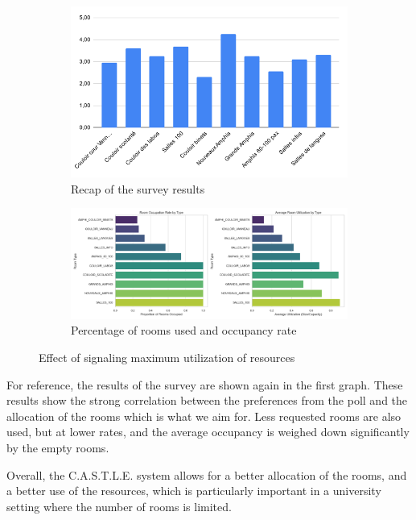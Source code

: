\documentclass[a4paper, oneside]{article}
\theoremstyle{plain}
\newcommand{\castle}{C{\small.}A{\small.}S{\small.}T{\small.}L{\small.}E{\small.}}
\begin{document}
\begin{figure}[H]
	\centering
	\begin{subfigure}{0.32\textwidth}
		\centering
		\includegraphics[width=\textwidth]{images/survey_result.png}
		\caption{Recap of the survey results}
		\label{fig:subfig1}
	\end{subfigure}
	\hfill
	\begin{subfigure}{0.65\textwidth}
		\centering
		\includegraphics[width=\textwidth]{images/ressource_priority.png}
		\caption{Percentage of rooms used and occupancy rate}
		\label{fig:subfig2}
	\end{subfigure}
	\caption{Effect of signaling maximum utilization of resources}
	\label{fig:mainfig}
\end{figure}

For reference, the results of the survey are shown again in the first graph. These results show the strong correlation between the preferences from the poll and the allocation of the rooms
which is what we aim for. Less requested rooms are also used, but at lower rates, and the average occupancy is weighed down significantly by the empty rooms.

Overall, the \castle{} system allows for a better allocation of the rooms, and a better use of the resources, which is particularly important in a university setting where the number of rooms is limited.
\end{document}

